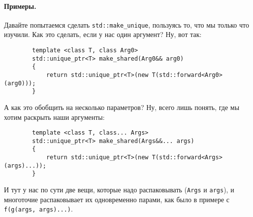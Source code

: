 \documentclass{article}
\begin{document}
    \paragraph{Примеры.}
    Давайте попытаемся сделать \texttt{std::make_unique}, пользуясь то, что мы только что изучили. Как это сделать, если у нас один аргумент? Ну, вот так:
    \begin{verbatim}
        template <class T, class Arg0>
        std::unique_ptr<T> make_shared(Arg0&& arg0)
        {
            return std::unique_ptr<T>(new T(std::forward<Arg0>(arg0)));
        }
    \end{verbatim}
    А как это обобщить на несколько параметров? Ну, всего лишь понять, где мы хотим раскрыть наши аргументы:
    \begin{verbatim}
        template <class T, class... Args>
        std::unique_ptr<T> make_shared(Args&&... args)
        {
            return std::unique_ptr<T>(new T(std::forward<Args>(args)...));
        }
    \end{verbatim}
    И тут у нас по сути две вещи, которые надо распаковывать (\texttt{Args} и \texttt{args}), и многоточие распаковывает их одновременно парами, как было в примере с \texttt{f(g(args, args)...)}.
\end{document}
